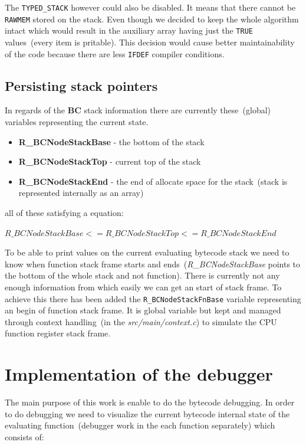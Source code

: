 \documentclass[thesis=M,english]{FITthesis}[2018/10/20]
\newcommand{\code}[1]{\texttt{#1}}
\begin{document}
The \code{TYPED{\_}STACK} however could also be disabled. It means that there cannot be \code{RAWMEM} stored on the stack. Even though we decided to keep the whole algorithm intact which would result in the auxiliary array having just the \code{TRUE} values~(every item is pritable). This decision would cause better maintainability of the code because there are less \code{IFDEF} compiler conditions.

\subsection{Persisting stack pointers}\label{persisting-stack-pointers}

In regards of the \textbf{BC} stack information there are currently these~(global) variables representing the current state.

\begin{itemize}
	\item \textbf{R{\_}BCNodeStackBase} - the bottom of the stack
	\item \textbf{R{\_}BCNodeStackTop} - current top of the stack
	\item \textbf{R{\_}BCNodeStackEnd} - the end of allocate space for the stack~(stack is represented internally as an array)
\end{itemize}

all of these satisfying a equation:

$R{\_}BCNodeStackBase <= R{\_}BCNodeStackTop <= R{\_}BCNodeStackEnd$


To be able to print values on the current evaluating bytecode stack we need to know when function stack frame starts and ends~(\textit{R{\_}BCNodeStackBase} points to the bottom of the whole stack and not function). There is currently not any enough information from which easily we can get an start of stack frame. To achieve this there has been added the \code{R{\_}BCNodeStackFnBase} variable representing an begin of function stack frame. It is global variable but kept and managed through context handling~(in the \textit{src/main/context.c}) to simulate the CPU function register stack frame.

\section{Implementation of the debugger}\label{implementation-of-debugger}

The main purpose of this work is enable to do the bytecode debugging. In order to do debugging we need to visualize the current bytecode internal state of the evaluating function~(debugger work in the each function separately) which consists of:
\end{document}
